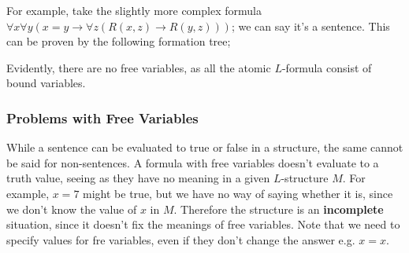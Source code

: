 \documentclass[a4paper, 12pt]{article}
\begin{document}
                For example, take the slightly more complex formula $\forall x \forall y (x = y \rightarrow \forall z (R(x, z) \rightarrow R(y, z)))$; we can say it's a sentence. This can be proven by the following formation tree;
                \begin{center}
                \end{center}
                Evidently, there are no free variables, as all the atomic $L$-formula consist of bound variables.
            \subsubsection*{Problems with Free Variables}
                While a sentence can be evaluated to true or false in a structure, the same cannot be said for non-sentences. A formula with free variables doesn't evaluate to a truth value, seeing as they have no meaning in a given $L$-structure $M$. For example, $x = 7$ might be true, but we have no way of saying whether it is, since we don't know the value of $x$ in $M$. Therefore the structure is an \textbf{incomplete} situation, since it doesn't fix the meanings of free variables. Note that we need to specify values for fre variables, even if they don't change the answer e.g. $x = x$.
                \medskip
\end{document}
